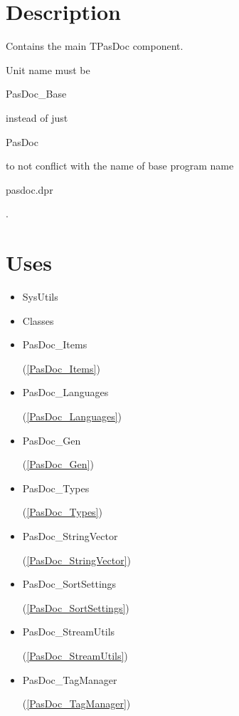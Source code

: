 \documentclass{report}
\begin{document}
\section{Description}
Contains the main TPasDoc component.\hfill\vspace*{1ex}

         

Unit name must be \begin{ttfamily}PasDoc{\_}Base\end{ttfamily} instead of just \begin{ttfamily}PasDoc\end{ttfamily} to not conflict with the name of base program name \begin{ttfamily}pasdoc.dpr\end{ttfamily}.
\section{Uses}
\begin{itemize}
\item \begin{ttfamily}SysUtils\end{ttfamily}\item \begin{ttfamily}Classes\end{ttfamily}\item \begin{ttfamily}PasDoc{\_}Items\end{ttfamily}(\ref{PasDoc_Items})\item \begin{ttfamily}PasDoc{\_}Languages\end{ttfamily}(\ref{PasDoc_Languages})\item \begin{ttfamily}PasDoc{\_}Gen\end{ttfamily}(\ref{PasDoc_Gen})\item \begin{ttfamily}PasDoc{\_}Types\end{ttfamily}(\ref{PasDoc_Types})\item \begin{ttfamily}PasDoc{\_}StringVector\end{ttfamily}(\ref{PasDoc_StringVector})\item \begin{ttfamily}PasDoc{\_}SortSettings\end{ttfamily}(\ref{PasDoc_SortSettings})\item \begin{ttfamily}PasDoc{\_}StreamUtils\end{ttfamily}(\ref{PasDoc_StreamUtils})\item \begin{ttfamily}PasDoc{\_}TagManager\end{ttfamily}(\ref{PasDoc_TagManager})\end{itemize}
\end{document}
